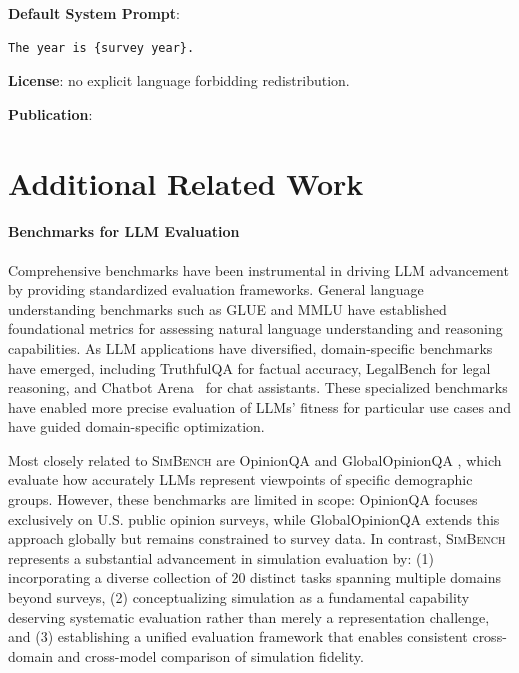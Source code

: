 \documentclass{article} %
\begin{document}
\textbf{Default System Prompt}:

\begin{examplebox}
\begin{Verbatim}[fontfamily=\rmdefault]
The year is {survey year}.
\end{Verbatim}
\end{examplebox}


\textbf{License}: no explicit language forbidding redistribution.

\textbf{Publication}: \cite{mede2025perceptions}





\section{Additional Related Work}
\label{AdditionalRelatedWork}

\paragraph{Benchmarks for LLM Evaluation}
Comprehensive benchmarks have been instrumental in driving LLM advancement by providing standardized evaluation frameworks. General language understanding benchmarks such as GLUE \citep{wang-etal-2018-glue} and MMLU \citep{hendrycks2020measuring} have established foundational metrics for assessing natural language understanding and reasoning capabilities. As LLM applications have diversified, domain-specific benchmarks have emerged, including TruthfulQA \citep{lin-etal-2022-truthfulqa} for factual accuracy, LegalBench \citep{guha2023legalbench} for legal reasoning, and Chatbot Arena~\citep{10.5555/3692070.3692401} for chat assistants. These specialized benchmarks have enabled more precise evaluation of LLMs' fitness for particular use cases and have guided domain-specific optimization.

Most closely related to \textsc{SimBench} are OpinionQA \citep{santurkar2023opinionqa} and GlobalOpinionQA \citep{durmus2024towards}, which evaluate how accurately LLMs represent viewpoints of specific demographic groups. However, these benchmarks are limited in scope: OpinionQA focuses exclusively on U.S. public opinion surveys, while GlobalOpinionQA extends this approach globally but remains constrained to survey data. In contrast, \textsc{SimBench} represents a substantial advancement in simulation evaluation by: (1) incorporating a diverse collection of 20 distinct tasks spanning multiple domains beyond surveys, (2) conceptualizing simulation as a fundamental capability deserving systematic evaluation rather than merely a representation challenge, and (3) establishing a unified evaluation framework that enables consistent cross-domain and cross-model comparison of simulation fidelity.
\end{document}
